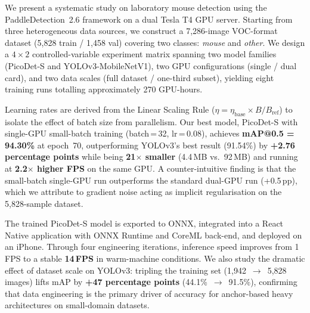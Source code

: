 We present a systematic study on laboratory mouse detection using the
PaddleDetection~2.6 framework on a dual Tesla T4 GPU server.
Starting from three heterogeneous data sources, we construct a
7,286-image VOC-format dataset (5,828 train / 1,458 val) covering
two classes: \textit{mouse} and \textit{other}.
We design a $4\!\times\!2$ controlled-variable experiment matrix
spanning two model families (PicoDet-S and YOLOv3-MobileNetV1),
two GPU configurations (single / dual card), and two data scales
(full dataset / one-third subset), yielding eight training runs
totalling approximately 270 GPU-hours.

Learning rates are derived from the Linear Scaling Rule
($\eta = \eta_\text{base}\!\times\! B/B_\text{ref}$) to isolate
the effect of batch size from parallelism.
Our best model, PicoDet-S with single-GPU small-batch training
(batch\,=\,32, lr\,=\,0.08), achieves \textbf{mAP@0.5 = 94.30\%}
at epoch~70, outperforming YOLOv3's best result
(91.54\%) by \textbf{+2.76 percentage points} while being
\textbf{21$\times$ smaller} (4.4\,MB vs.\ 92\,MB) and running at
\textbf{2.2$\times$ higher FPS} on the same GPU.
A counter-intuitive finding is that the small-batch single-GPU run
outperforms the standard dual-GPU run (+0.5\,pp), which we attribute
to gradient noise acting as implicit regularisation on the
5,828-sample dataset.

The trained PicoDet-S model is exported to ONNX, integrated into a
React Native application with ONNX Runtime and CoreML back-end,
and deployed on an iPhone.  Through four engineering iterations,
inference speed improves from 1\,FPS to a stable \textbf{14\,FPS}
in warm-machine conditions.
We also study the dramatic effect of dataset scale on YOLOv3:
tripling the training set (1,942~$\to$~5,828 images) lifts mAP
by \textbf{+47 percentage points} (44.1\%~$\to$~91.5\%),
confirming that data engineering is the primary driver of accuracy
for anchor-based heavy architectures on small-domain datasets.
